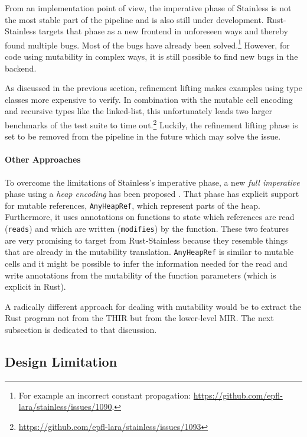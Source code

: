 From an implementation point of view, the imperative phase of Stainless is not
the most stable part of the pipeline and is also still under development.
Rust-Stainless targets that phase as a new frontend in unforeseen ways  and
thereby found multiple bugs. Most of the bugs have already been
solved.\footnote{For example an incorrect constant propagation:
\url{https://github.com/epfl-lara/stainless/issues/1090}.} However, for code
using mutability in complex ways, it is still possible to find new bugs in the
backend.

As discussed in the previous section, refinement lifting makes examples using
type classes more expensive to verify. In combination with the mutable cell
encoding and recursive types like the linked-list, this unfortunately leads two
larger benchmarks of the test suite to time
out.\footnote{\url{https://github.com/epfl-lara/stainless/issues/1093}} Luckily,
the refinement lifting phase is set to be removed from the pipeline in the
future which may solve the issue.

\paragraph{Other Approaches}

To overcome the limitations of Stainless's imperative phase, a new \emph{full
imperative} phase using a \emph{heap encoding} has been proposed
\cite{new-imperative}. That phase has explicit support for mutable references,
\lstinline!AnyHeapRef!, which represent parts of the heap. Furthermore, it uses
annotations on functions to state which references are read (\lstinline!reads!)
and which are written (\lstinline!modifies!) by the function. These two features
are very promising to target from Rust-Stainless because they resemble things
that are already in the mutability translation. \lstinline!AnyHeapRef! is
similar to mutable cells and it might be possible to infer the information
needed for the read and write annotations from the mutability of the function
parameters (which is explicit in Rust).

A radically different approach for dealing with mutability would be to extract
the Rust program not from the THIR but from the lower-level MIR. The next
subsection is dedicated to that discussion.

\subsection{Design Limitation}
\label{mir-thir}

